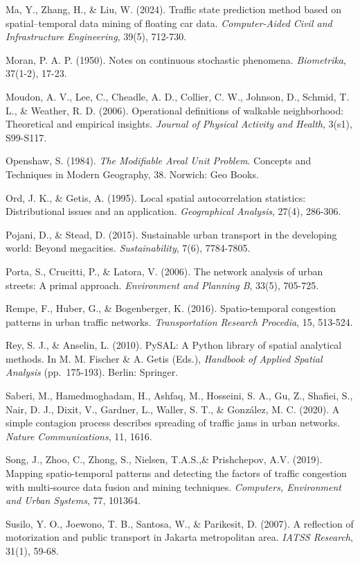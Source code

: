 \documentclass[12pt,a4paper]{article}
\begin{document}
Ma, Y., Zhang, H., \& Liu, W. (2024). Traffic state prediction method based on spatial--temporal data mining of floating car data. \emph{Computer-Aided Civil and Infrastructure Engineering}, 39(5), 712-730.

Moran, P. A. P. (1950). Notes on continuous stochastic phenomena. \emph{Biometrika}, 37(1-2), 17-23.

Moudon, A. V., Lee, C., Cheadle, A. D., Collier, C. W., Johnson, D., Schmid, T. L., \& Weather, R. D. (2006). Operational definitions of walkable neighborhood: Theoretical and empirical insights. \emph{Journal of Physical Activity and Health}, 3(s1), S99-S117.

Openshaw, S. (1984). \emph{The Modifiable Areal Unit Problem}. Concepts and Techniques in Modern Geography, 38. Norwich: Geo Books.

Ord, J. K., \& Getis, A. (1995). Local spatial autocorrelation statistics: Distributional issues and an application. \emph{Geographical Analysis}, 27(4), 286-306.

Pojani, D., \& Stead, D. (2015). Sustainable urban transport in the developing world: Beyond megacities. \emph{Sustainability}, 7(6), 7784-7805.

Porta, S., Crucitti, P., \& Latora, V. (2006). The network analysis of urban streets: A primal approach. \emph{Environment and Planning B}, 33(5), 705-725.

Rempe, F., Huber, G., \& Bogenberger, K. (2016). Spatio-temporal congestion patterns in urban traffic networks. \emph{Transportation Research Procedia}, 15, 513-524.

Rey, S. J., \& Anselin, L. (2010). PySAL: A Python library of spatial analytical methods. In M. M. Fischer \& A. Getis (Eds.), \emph{Handbook of Applied Spatial Analysis} (pp.~175-193). Berlin: Springer.

Saberi, M., Hamedmoghadam, H., Ashfaq, M., Hosseini, S. A., Gu, Z., Shafiei, S., Nair, D. J., Dixit, V., Gardner, L., Waller, S. T., \& Gonz\'{a}lez, M. C. (2020). A simple contagion process describes spreading of traffic jams in urban networks. \emph{Nature Communications}, 11, 1616.

Song, J.,  Zhoo, C., Zhong, S., Nielsen,  T.A.S.,\& Prishchepov, A.V. (2019). Mapping spatio-temporal patterns and detecting the factors of traffic congestion with multi-source data fusion and mining techniques. \emph{Computers, Environment and Urban Systems}, 77, 101364.

Susilo, Y. O., Joewono, T. B., Santosa, W., \& Parikesit, D. (2007). A reflection of motorization and public transport in Jakarta metropolitan area. \emph{IATSS Research}, 31(1), 59-68.
\end{document}

